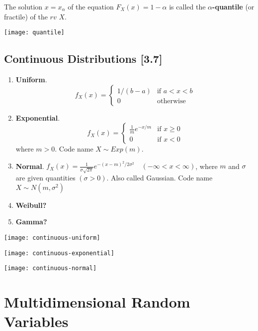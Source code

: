 \documentclass[a4paper,9pt]{extarticle}
\begin{document}
\begin{multicols*}{2}
The solution $x = x_\alpha$ of the equation $F_X(x) = 1 - \alpha$
is called the \textbf{$\alpha$-quantile} (or fractile) of the $rv$ $X$.

{\centering \texttt{[image: quantile]} \par}

\subsection{Continuous Distributions [3.7]}
\begin{enumerate}[label=\bfseries (\alph*)]
    \item \textbf{Uniform}. \begin{equation}
        f_X(x)=\begin{cases}
            1/(b-a) & \text{if $a < x < b$}\\
            0 & \text{otherwise}
        \end{cases}
    \end{equation}
    \item \textbf{Exponential}. \begin{equation}
        f_X(x)=\begin{cases}
            \frac{1}{m} e^{-x/m} & \text{if $x \geq 0$}\\
            0 & \text{if $x < 0$}
        \end{cases}
    \end{equation} where $m > 0$. Code name $X \sim Exp(m)$.
    \item \textbf{Normal}. $f_X(x) = \frac{1}{\sigma \sqrt{2 \pi}} e^{-(x-m)^2 / 2 \sigma^2} \quad (-\infty < x < \infty)$, where $m$ and $\sigma$ are given quantities $(\sigma > 0)$. Also called Gaussian. Code name $X \sim N(m, \sigma^2)$
    \item \textbf{Weibull?}
    \item \textbf{Gamma?}
\end{enumerate}

{\centering \texttt{[image: continuous-uniform]} \par}
{\centering \texttt{[image: continuous-exponential]} \par}
{\centering \texttt{[image: continuous-normal]} \par}

\section{Multidimensional Random Variables}

\end{multicols*}
\end{document}

